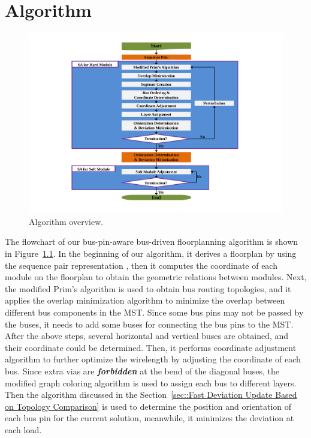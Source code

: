 \chapter{Algorithm}
\label{chap::ALGORITHM}

\baselineskip=26pt

\begin{figure}[htb]
  \centering
   \includegraphics[width=13cm]{Fig/flowchart.pdf}
     \caption{
      Algorithm overview.
   }
  \label{fig::flowchart}
\end{figure}

The flowchart of our bus-pin-aware bus-driven floorplanning
algorithm is shown in Figure~\ref{fig::flowchart}.
In the beginning of our algorithm, it derives a floorplan by using
the sequence pair representation \cite{Murata95}, then it computes
the coordinate of each module on the floorplan to obtain the geometric
relations between modules.
Next, the modified Prim's algorithm is used to obtain bus routing topologies,
and it applies the overlap minimization algorithm to minimize the overlap between
different bus components in the MST.
Since some bus pins may not be passed by the buses, it needs to add some buses
for connecting the bus pins to the MST.
After the above steps, several horizontal and vertical buses are obtained,
and their coordinate could be determined. Then, it performs coordinate adjustment algorithm
to further optimize the wirelength by adjusting the coordinate of each bus.
Since extra vias are \textbf{\textit{forbidden}}
at the bend of the diagonal buses, the modified graph coloring algorithm
is used to assign each bus to different layers.
Then the algorithm discussed in the Section~\ref{sec::Fast Deviation Update Based on Topology Comparison}
is used to determine the position and orientation of each bus pin for the current solution, meanwhile, it
minimizes the deviation at each load.

